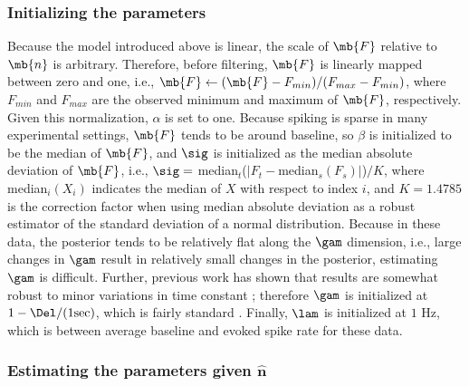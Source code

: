 \subsubsection{Initializing the parameters} \label{sec:init}

Because the model introduced above is linear, the scale of $\mb{F}$ relative to $\mb{n}$ is arbitrary.  Therefore, before filtering, $\mb{F}$ is linearly mapped between zero and one, i.e., $\mb{F} \leftarrow (\mb{F} - F_{min})/(F_{max}-F_{min})$, where $F_{min}$ and $F_{max}$ are the observed minimum and maximum of $\mb{F}$, respectively.  Given this normalization, $\alpha$ is set to one.  Because spiking is sparse in many experimental settings, $\mb{F}$ tends to be around baseline, so $\beta$ is initialized to be the median of $\mb{F}$, and $\sig$ is initialized as the median absolute deviation of $\mb{F}$, i.e.,  $\sig=$ median$_t$($|F_t-$median$_s(F_s)|$)$/K$, where median$_i(X_i)$ indicates the median of $X$ with respect to index $i$, and $K=1.4785$ is the correction factor when using median absolute deviation as a robust estimator of the standard deviation of a normal distribution.  Because in these data, the posterior tends to be relatively flat along the $\gam$ dimension, i.e.,  large changes in $\gam$ result in relatively small changes in the posterior, estimating $\gam$ is difficult.  Further, previous work has shown that results are somewhat robust to minor variations in time constant \cite{YaksiFriedrich06}; therefore $\gam$ is initialized at $1-\Del/(1 \text{sec})$, which is fairly standard \cite{PologrutoSvoboda04}. Finally, $\lam$ is initialized at $1$ Hz, which is between average baseline and evoked spike rate for these data.

\subsubsection{Estimating the parameters given $\widehat{\mathbf{n}}$} \label{sec:242}

